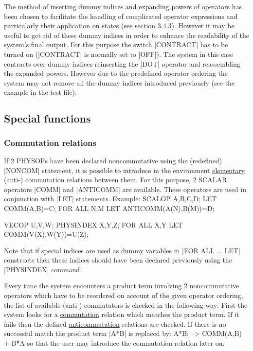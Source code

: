 The method of inserting dummy indices and expanding powers of
operators has been chosen to facilitate the handling of
complicated operator
expressions and particularly their application  on states
(see section 3.4.3). However it may be useful to get rid of these
dummy indices in order to enhance the readability of the
system's final output.
For this purpose the switch |CONTRACT|  has to
be turned on (|CONTRACT| is normally set to |OFF|).
The system in this case contracts over dummy indices reinserting the
|DOT| operator and reassembling the expanded powers.  However due to
the predefined operator ordering the system may not remove all the
dummy indices introduced  previously (see the example in the test file).

\subsection{Special functions}

\subsubsection{Commutation relations}

If 2 PHYSOPs have been declared noncommutative using the (redefined)
|NONCOM| statement, it is possible to introduce in the environment
\underline{elementary} (anti-) commutation relations between them. For
this purpose,
2 SCALAR operators |COMM|  and |ANTICOMM|
 are available.
These operators are used in conjunction with |LET| statements.
Example:
\begintt
SCALOP A,B,C,D;
LET COMM(A,B)=C;
FOR ALL N,M LET ANTICOMM(A(N),B(M))=D;

VECOP U,V,W; PHYSINDEX X,Y,Z;
FOR ALL X,Y LET COMM(V(X),W(Y))=U(Z);
\endtt

Note that if special indices are used as dummy variables in
|FOR ALL ... LET| constructs then these indices should  have been
declared previously using the |PHYSINDEX| command.

Every time the system
encounters a product term involving 2
noncommutative operators which have to be reordered on account of the
given operator ordering, the list of available (anti-) commutators is
checked in the following way: First the system looks for a
\underline{commutation} relation which matches the  product term. If it
fails then the defined \underline{anticommutation} relations are
checked. If there is no successful match the product term
 |A*B| is replaced by:
\begintt
A*B;
 --> COMM(A,B) + B*A
\endtt
so that the user may introduce the commutation relation later on.

